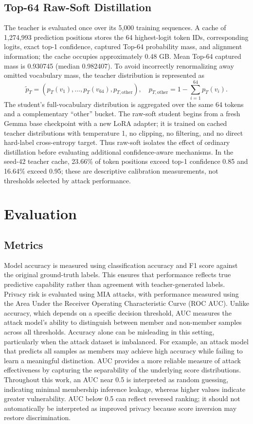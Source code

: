 \documentclass[conference]{IEEEtran}
\begin{document}
\subsection{Top-64 Raw-Soft Distillation}
The teacher is evaluated once over its 5,000 training sequences. A cache of 1,274,993 prediction positions stores the 64 highest-logit token IDs, corresponding logits, exact top-1 confidence, captured Top-64 probability mass, and alignment information; the cache occupies approximately 0.48 GB. Mean Top-64 captured mass is 0.930745 (median 0.982407). To avoid incorrectly renormalizing away omitted vocabulary mass, the teacher distribution is represented as
\begin{equation}
\widetilde{p}_T=(p_T(v_1),\ldots,p_T(v_{64}),p_{T,\mathrm{other}}),\quad
p_{T,\mathrm{other}}=1-\sum_{i=1}^{64}p_T(v_i).
\end{equation}
The student's full-vocabulary distribution is aggregated over the same 64 tokens and a complementary ``other'' bucket. The raw-soft student begins from a fresh Gemma base checkpoint with a new LoRA adapter; it is trained on cached teacher distributions with temperature 1, no clipping, no filtering, and no direct hard-label cross-entropy target. Thus raw-soft isolates the effect of ordinary distillation before evaluating additional confidence-aware mechanisms. In the seed-42 teacher cache, 23.66\% of token positions exceed top-1 confidence 0.85 and 16.64\% exceed 0.95; these are descriptive calibration measurements, not thresholds selected by attack performance.

\section{Evaluation}

\subsection{Metrics}
Model accuracy is measured using classification accuracy and F1 score against the original ground-truth labels. This ensures that performance reflects true predictive capability rather than agreement with teacher-generated labels.
Privacy risk is evaluated using MIA attacks, with performance measured using the Area Under the Receiver Operating Characteristic Curve (ROC AUC). Unlike accuracy, which depends on a specific decision threshold, AUC measures the attack model’s ability to distinguish between member and non-member samples across all thresholds.
Accuracy alone can be misleading in this setting, particularly when the attack dataset is imbalanced. For example, an attack model that predicts all samples as members may achieve high accuracy while failing to learn a meaningful distinction. AUC provides a more reliable measure of attack effectiveness by capturing the separability of the underlying score distributions.
Throughout this work, an AUC near 0.5 is interpreted as random guessing, indicating minimal membership inference leakage, whereas higher values indicate greater vulnerability. AUC below 0.5 can reflect reversed ranking; it should not automatically be interpreted as improved privacy because score inversion may restore discrimination.
\end{document}
